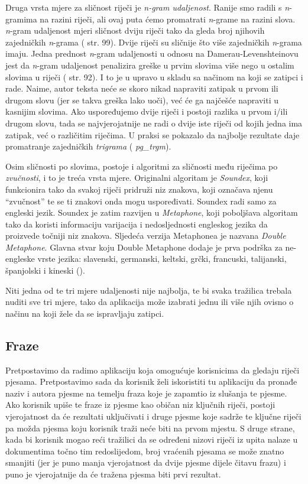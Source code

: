 \documentclass[a4paper,twoside,12pt]{scrreprt}
\begin{document}
Druga vrsta mjere za sličnost riječi je \textit{n-gram udaljenost}. Ranije smo radili s \textit{n}-gramima na razini riječi, ali ovaj puta ćemo promatrati \textit{n}-grame na razini slova. \textit{n}-gram udaljenost mjeri sličnost dviju riječi tako da gleda broj njihovih zajedničkih \textit{n}-grama (\cite{taming} str. 99). Dvije riječi su sličnije što više zajedničkih \textit{n}-grama imaju. Jedna prednost \textit{n}-gram udaljenosti u odnosu na Damerau-Levenshteinovu jest da \textit{n}-gram udaljenost penalizira greške u prvim slovima više nego u ostalim slovima u riječi (\cite{taming} str. 92). I to je u upravo u skladu sa načinom na koji se zatipci i rade. Naime, autor teksta neće se skoro nikad napraviti zatipak u prvom ili drugom slovu (jer se takva greška lako uoči), već će ga najčešće napraviti u kasnijim slovima. Ako uspoređujemo dvije riječi i postoji razlika u prvom i/ili drugom slovu, tada se najvjerojatnije ne radi o dvije iste riječi od kojih jedna ima zatipak, već o različitim riječima. U praksi se pokazalo da najbolje rezultate daje promatranje zajedničkih \textit{trigrama} (\cite{postgres} \textit{pg\_trgm}).

Osim sličnosti po slovima, postoje i algoritmi za sličnosti među riječima po \textit{zvučnosti}, i to je treća vrsta mjere. Originalni algoritam je \textit{Soundex}, koji funkcionira tako da svakoj riječi pridruži niz znakova, koji označava njenu ``zvučnost'' te se ti znakovi onda mogu uspoređivati. Soundex radi samo za engleski jezik. Soundex je zatim razvijen u \textit{Metaphone}, koji poboljšava algoritam tako da koristi informaciju varijacija i nedosljednosti engleskog jezika da proizvede točniji niz znakova. Sljedeća verzija Metaphonea je nazvana \textit{Double Metaphone}. Glavna stvar koju Double Metaphone dodaje je prva podrška za ne-engleske vrste jezika: slavenski, germanski, keltski, grčki, francuski, talijanski, španjolski i kineski (\cite{metaphone}).

Niti jedna od te tri mjere udaljenosti nije najbolja, te bi svaka tražilica trebala nuditi sve tri mjere, tako da aplikacija može izabrati jednu ili više njih ovisno o načinu na koji žele da se ispravljaju zatipci.

\subsection{Fraze}

Pretpostavimo da radimo aplikaciju koja omogućuje korisnicima da gledaju riječi pjesama. Pretpostavimo sada da korisnik želi iskoristiti tu aplikaciju da pronađe naziv i autora pjesme na temelju fraza koje je zapamtio iz slušanja te pjesme. Ako korisnik upiše te fraze iz pjesme kao običan niz ključnih riječi, postoji vjerojatnost da će rezultati uključivati i druge pjesme koje sadrže te ključne riječi pa možda pjesma koju korisnik traži neće biti na prvom mjestu. S druge strane, kada bi korisnik mogao reći tražilici da se određeni nizovi riječi iz upita nalaze u dokumentima točno tim redoslijedom, broj vraćenih pjesama se može znatno smanjiti (jer je puno manja vjerojatnost da dvije pjesme dijele čitavu frazu) i puno je vjerojatnije da će tražena pjesma biti prvi rezultat.
\end{document}
